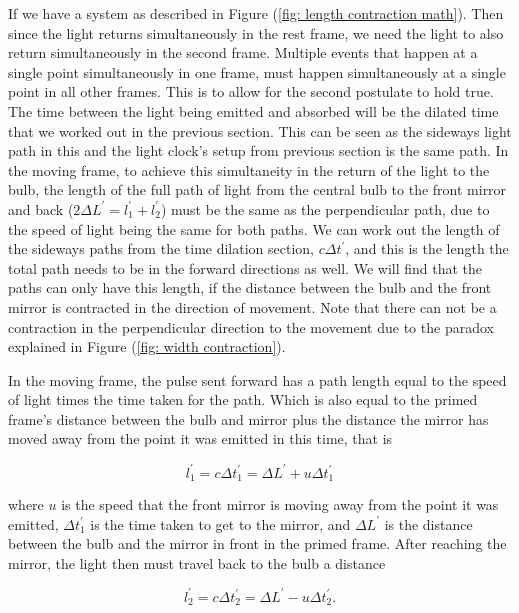 If we have a system as described in Figure (\ref{fig: length contraction math}).
Then since the light returns simultaneously in the rest frame, we need the light to also return simultaneously in the second frame.
Multiple events that happen at a single point simultaneously in one frame, must happen simultaneously at a single point in all other frames.
This is to allow for the second postulate to hold true.
The time between the light being emitted and absorbed will be the dilated time that we worked out in the previous section.
This can be seen as the sideways light path in this and the light clock's setup from previous section is the same path.
In the moving frame, to achieve this simultaneity in the return of the light to the bulb, the length of the full path of light from the central bulb to the front mirror and back ($2 {\Delta L^{'}} = {l^{'}_1} + {l^{'}_2}$) must be the same as the perpendicular path, due to the speed of light being the same for both paths.
We can work out the length of the sideways paths from the time dilation section, ${c}{\Delta t^{'}}$, and this is the length the total path needs to be in the forward directions as well.
We will find that the paths can only have this length, if the distance between the bulb and the front mirror is contracted in the direction of movement.
Note that there can not be a contraction in the perpendicular direction to the movement due to the paradox explained in Figure (\ref{fig: width contraction}).

In the moving frame, the pulse sent forward has a path length equal to the speed of light times the time taken for the path.
Which is also equal to the primed frame's distance between the bulb and mirror plus the distance the mirror has moved away from the point it was emitted in this time, that is

\begin{equation}
	{l^{'}_1} = {c}{\Delta t^{'}_1} = {\Delta  L^{'}} + {u} {\Delta t^{'}_1}
\end{equation}

where ${u}$ is the speed that the front mirror is moving away from the point it was emitted, ${\Delta t^{'}_1}$ is the time taken to get to the mirror, and ${\Delta  L^{'}}$ is the distance between the bulb and the mirror in front in the primed frame.
After reaching the mirror, the light then must travel back to the bulb a distance

\begin{equation}
	{l^{'}_2} = {c} {\Delta t^{'}_2} = {\Delta  L^{'}} - {u} {\Delta t^{'}_2}.
\end{equation}

